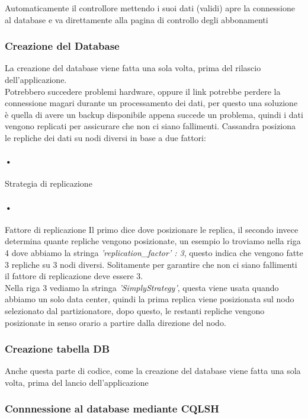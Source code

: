 Automaticamente il controllore mettendo i suoi dati (validi) apre la connessione al database e va direttamente alla pagina di controllo degli abbonamenti
\subsubsection{Creazione del Database}


La creazione del database viene fatta una sola volta, prima del rilascio dell'applicazione. 
\\Potrebbero succedere problemi hardware, oppure il link potrebbe perdere la connessione magari durante un processamento dei dati, per questo una soluzione è quella di avere un backup disponibile appena succede un problema, quindi i dati vengono replicati per assicurare che non ci siano fallimenti. Cassandra posiziona le repliche dei dati su nodi diversi in base a due fattori:
\paragraph{•} Strategia di replicazione
\paragraph{•} Fattore di replicazione
Il primo dice dove posizionare le replica, il secondo invece determina quante repliche vengono posizionate, un esempio lo troviamo nella riga 4 dove abbiamo la stringa \textit{'replication\_factor' : 3}, questo indica che vengono fatte 3 repliche su 3 nodi diversi. Solitamente per garantire che non ci siano fallimenti il fattore di replicazione deve essere 3.
\\Nella riga 3 vediamo la stringa \textit{'SimplyStrategy'}, questa viene usata quando abbiamo un solo data center, quindi la prima replica viene posizionata sul nodo selezionato dal partizionatore, dopo questo, le restanti repliche vengono posizionate in senso orario a partire dalla direzione del nodo.
\subsubsection{Creazione tabella DB}


Anche questa parte di codice, come la creazione del database viene fatta una sola volta, prima del lancio dell'applicazione
\subsubsection{Connnessione al database mediante CQLSH}
